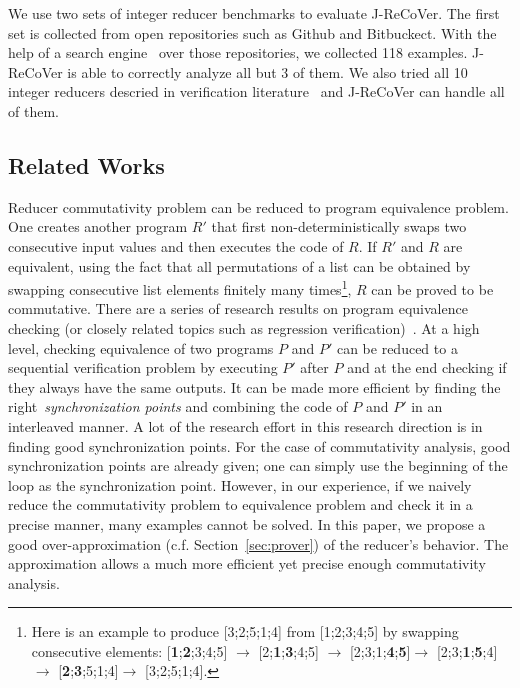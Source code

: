 \documentclass{llncs}
\begin{document}
We use two sets of integer reducer benchmarks to evaluate J-ReCoVer. The first set is collected from open repositories such as Github and Bitbuckect. With the help of a search engine~\cite{searchcode} over those repositories, we collected 118 examples. J-ReCoVer is able to correctly analyze all but 3 of them. We also tried all 10 integer reducers descried in verification literature~\cite{ChenHSW15,ChenSW16} and J-ReCoVer can handle all of them.


\subsection*{Related Works}
Reducer commutativity problem can be reduced to program equivalence problem. One creates another program $R'$ that first non-deterministically swaps two consecutive input values and then executes the code of $R$. If $R'$ and $R$ are equivalent, using the fact that all permutations of a list can be obtained by swapping consecutive list elements finitely many times\footnote{Here is an example to produce [3;2;5;1;4] from [1;2;3;4;5] by swapping consecutive elements: [\textbf{1};\textbf{2};3;4;5] $\rightarrow$ [2;\textbf{1};\textbf{3};4;5] $\rightarrow$ [2;3;1;\textbf{4};\textbf{5}]$\rightarrow$ [2;3;\textbf{1};\textbf{5};4]$\rightarrow$ [\textbf{2};\textbf{3};5;1;4]$\rightarrow$ [3;2;5;1;4].}, $R$ can be proved to be commutative. There are a series of research results on program equivalence checking (or closely related topics such as regression verification)~\cite{symdiff,fedyukovich2015automated,sharma2013data,godlin2009regression,fedyukovich2016property,felsing2014automating,KieferKlebanovUlbrich2017,lahiri2013differential,grossman2017verifying,barthe2011relational,KlebanovRuemmerUlbrich2017}. At a high level, checking equivalence of two programs $P$ and $P'$ can be reduced to a sequential verification problem by executing $P'$ after $P$ and at the end checking if they always have the same outputs. It can be made more efficient by finding the right~\emph{synchronization points} and combining the code of $P$ and $P'$ in an interleaved manner. A lot of the research effort in this research direction is in finding good synchronization points. For the case of commutativity analysis, good synchronization points are already given; one can simply use the beginning of the loop as the synchronization point. However, in our experience, if we naively reduce the commutativity problem to equivalence problem and check it in a precise manner, many examples cannot be solved. In this paper, we propose a good over-approximation (c.f. Section~\ref{sec:prover}) of the reducer's behavior. The approximation allows a much more efficient yet precise enough commutativity analysis.
\end{document}
